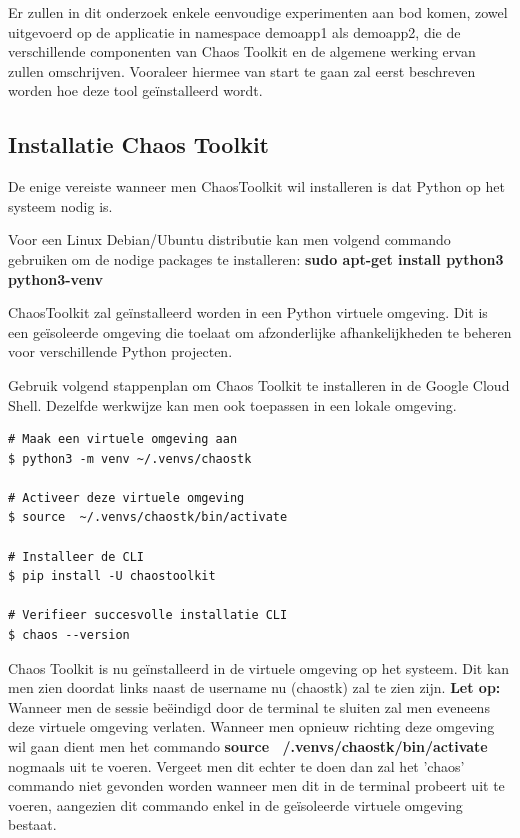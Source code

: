 Er zullen in dit onderzoek enkele eenvoudige experimenten aan bod komen, zowel uitgevoerd op de applicatie in namespace demoapp1 als demoapp2, die de verschillende componenten van Chaos Toolkit en de algemene werking ervan zullen omschrijven. Vooraleer hiermee van start te gaan zal eerst beschreven worden hoe deze tool geïnstalleerd wordt.    

\subsection{Installatie Chaos Toolkit}

De enige vereiste wanneer men ChaosToolkit wil installeren is dat Python op het systeem nodig is. \autocite{ChaosToolkit2022b}

Voor een Linux Debian/Ubuntu distributie kan men volgend commando gebruiken om de nodige packages te installeren: {\bf sudo apt-get install python3 python3-venv}
 
ChaosToolkit zal geïnstalleerd worden in een Python virtuele omgeving. Dit is een geïsoleerde omgeving die toelaat om afzonderlijke afhankelijkheden te beheren voor verschillende Python projecten. \autocite{UniMinnesota2022}

Gebruik volgend stappenplan om Chaos Toolkit te installeren in de Google Cloud Shell. Dezelfde werkwijze kan men ook toepassen in een lokale omgeving.
\begin{lstlisting}
# Maak een virtuele omgeving aan
$ python3 -m venv ~/.venvs/chaostk

# Activeer deze virtuele omgeving
$ source  ~/.venvs/chaostk/bin/activate

# Installeer de CLI
$ pip install -U chaostoolkit

# Verifieer succesvolle installatie CLI
$ chaos --version
\end{lstlisting}

Chaos Toolkit is nu geïnstalleerd in de virtuele omgeving op het systeem. Dit kan men zien doordat links naast de username nu (chaostk) zal te zien zijn. 
{\bf Let op:} Wanneer men de sessie beëindigd door de terminal te sluiten zal men eveneens deze virtuele omgeving verlaten. Wanneer men opnieuw richting deze omgeving wil gaan dient men het commando {\bf source  ~/.venvs/chaostk/bin/activate} nogmaals uit te voeren. Vergeet men dit echter te doen dan zal het 'chaos' commando niet gevonden worden wanneer men dit in de terminal probeert uit te voeren, aangezien dit commando enkel in de geïsoleerde virtuele omgeving bestaat.

